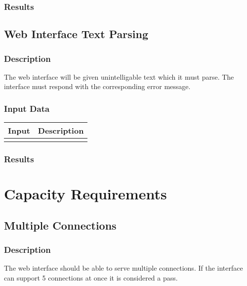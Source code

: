 \documentclass{scrreprt}
\begin{document}
\subsubsection{Results}

\subsection{Web Interface Text Parsing}
\subsubsection{Description}
\begin{flushleft}
The web interface will be given unintelligable text which it must parse. The interface must respond with the corresponding error message.
\end{flushleft}
\subsubsection{Input Data}
 \centering
 \begin{tabular}{p{3cm}p{6cm}}
 \hline\hline
 Input & Description\\
 \hline\hline
   &  \\ %
 \hline
 \end{tabular}
\subsubsection{Results}

\section{Capacity Requirements}

\subsection{Multiple Connections}
\subsubsection{Description}
\begin{flushleft}
The web interface should be able to serve multiple connections. If the interface can support 5 connections at once it is considered a pass.
\end{flushleft}
\end{document}
